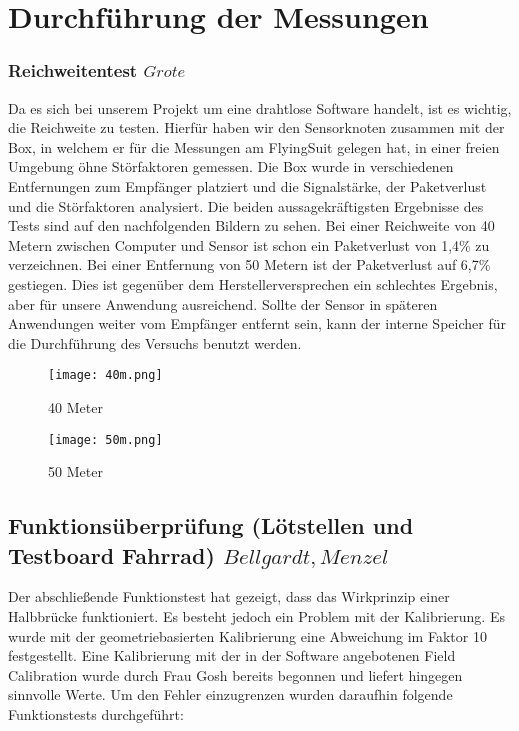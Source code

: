\chapter{Durchf\"uhrung der Messungen}

\subsection{Reichweitentest \(Grote\)}

Da es sich bei unserem Projekt um eine drahtlose Software handelt, ist es wichtig, die Reichweite zu testen. Hierfür haben wir den Sensorknoten zusammen mit der Box, in welchem er für die Messungen am FlyingSuit gelegen hat, in einer freien Umgebung öhne Störfaktoren gemessen. Die Box wurde in verschiedenen Entfernungen zum Empfänger platziert und die Signalstärke, der Paketverlust und die Störfaktoren analysiert. Die beiden aussagekräftigsten Ergebnisse des Tests sind auf den nachfolgenden Bildern zu sehen.
Bei einer Reichweite von 40 Metern zwischen Computer und Sensor ist schon ein Paketverlust von 1,4\% zu verzeichnen. Bei einer Entfernung von 50 Metern ist der Paketverlust auf 6,7\% gestiegen. Dies ist gegenüber dem Herstellerversprechen ein schlechtes Ergebnis, aber für unsere Anwendung ausreichend. Sollte der Sensor in späteren Anwendungen weiter vom Empfänger entfernt sein, kann der interne Speicher für die Durchführung des Versuchs benutzt werden.

\begin{figure}[h]
    \begin{center}
        \texttt{[image: 40m.png]}
        \caption[Reichweitentest 40 Meter]{40 Meter
        }
        \label{fig:40m}
    \end{center}
\end{figure}

\begin{figure}[h]
    \begin{center}
        \texttt{[image: 50m.png]}
        \caption[Reichweitentest 50 Meter]{50 Meter
        }
        \label{fig:50m}
    \end{center}
\end{figure}


\section{Funktions\"uberpr\"ufung (L\"otstellen und Testboard Fahrrad) \(Bellgardt, Menzel\)}
Der abschließende Funktionstest hat gezeigt, dass das Wirkprinzip einer Halbbrücke funktioniert. Es besteht jedoch ein Problem mit der Kalibrierung.
Es wurde mit der geometriebasierten Kalibrierung eine Abweichung im Faktor 10 festgestellt.
Eine Kalibrierung mit der in der Software angebotenen Field Calibration wurde durch Frau Gosh bereits begonnen und liefert hingegen sinnvolle Werte.
Um den Fehler einzugrenzen wurden daraufhin folgende Funktionstests durchgeführt:


